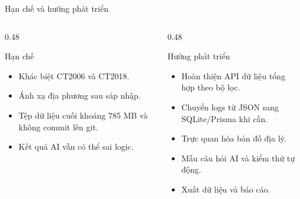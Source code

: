 \documentclass[aspectratio=169,11pt]{beamer}
\begin{document}
\begin{frame}{Hạn chế và hướng phát triển}
  \begin{columns}[T,onlytextwidth]
    \begin{column}{0.48\textwidth}
      \begin{block}{Hạn chế}
        \small
        \begin{itemize}
          \item Khác biệt CT2006 và CT2018.
          \item Ánh xạ địa phương sau sáp nhập.
        \item Tệp dữ liệu cuối khoảng 785 MB và không commit lên git.
          \item Kết quả AI vẫn có thể sai logic.
        \end{itemize}
      \end{block}
    \end{column}
    \begin{column}{0.48\textwidth}
      \begin{block}{Hướng phát triển}
        \small
        \begin{itemize}
          \item Hoàn thiện API dữ liệu tổng hợp theo bộ lọc.
          \item Chuyển logs từ JSON sang SQLite/Prisma khi cần.
          \item Trực quan hóa bản đồ địa lý.
          \item Mẫu câu hỏi AI và kiểm thử tự động.
          \item Xuất dữ liệu và báo cáo.
        \end{itemize}
      \end{block}
    \end{column}
  \end{columns}
\end{frame}
\end{document}
